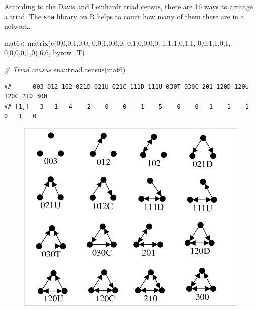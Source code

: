 \documentclass[
  notitlepage,
  onecolumn,
  openany]{book}
\newenvironment{Shaded}{\begin{snugshade}}{\end{snugshade}}
\newcommand{\AttributeTok}[1]{\textcolor[rgb]{0.77,0.63,0.00}{#1}}
\newcommand{\CommentTok}[1]{\textcolor[rgb]{0.56,0.35,0.01}{\textit{#1}}}
\newcommand{\DecValTok}[1]{\textcolor[rgb]{0.00,0.00,0.81}{#1}}
\newcommand{\FunctionTok}[1]{\textcolor[rgb]{0.00,0.00,0.00}{#1}}
\newcommand{\NormalTok}[1]{#1}
\newcommand{\OtherTok}[1]{\textcolor[rgb]{0.56,0.35,0.01}{#1}}
\newcommand{\SpecialCharTok}[1]{\textcolor[rgb]{0.00,0.00,0.00}{#1}}
\begin{document}
According to the Davis and Leinhardt triad census, there are 16 ways to arrange a triad. The \texttt{sna} library on R helps to count how many of them there are in a network.

\begin{Shaded}
\begin{Highlighting}[]
\NormalTok{mat6}\OtherTok{\textless{}{-}}\FunctionTok{matrix}\NormalTok{(}\FunctionTok{c}\NormalTok{(}\DecValTok{0}\NormalTok{,}\DecValTok{0}\NormalTok{,}\DecValTok{0}\NormalTok{,}\DecValTok{1}\NormalTok{,}\DecValTok{0}\NormalTok{,}\DecValTok{0}\NormalTok{,}
               \DecValTok{0}\NormalTok{,}\DecValTok{0}\NormalTok{,}\DecValTok{1}\NormalTok{,}\DecValTok{0}\NormalTok{,}\DecValTok{0}\NormalTok{,}\DecValTok{0}\NormalTok{,}
               \DecValTok{0}\NormalTok{,}\DecValTok{1}\NormalTok{,}\DecValTok{0}\NormalTok{,}\DecValTok{0}\NormalTok{,}\DecValTok{0}\NormalTok{,}\DecValTok{0}\NormalTok{,}
               \DecValTok{1}\NormalTok{,}\DecValTok{1}\NormalTok{,}\DecValTok{1}\NormalTok{,}\DecValTok{0}\NormalTok{,}\DecValTok{1}\NormalTok{,}\DecValTok{1}\NormalTok{,}
               \DecValTok{0}\NormalTok{,}\DecValTok{0}\NormalTok{,}\DecValTok{1}\NormalTok{,}\DecValTok{1}\NormalTok{,}\DecValTok{0}\NormalTok{,}\DecValTok{1}\NormalTok{,}
               \DecValTok{0}\NormalTok{,}\DecValTok{0}\NormalTok{,}\DecValTok{0}\NormalTok{,}\DecValTok{0}\NormalTok{,}\DecValTok{1}\NormalTok{,}\DecValTok{0}\NormalTok{),}\DecValTok{6}\NormalTok{,}\DecValTok{6}\NormalTok{, }\AttributeTok{byrow=}\NormalTok{T)}

\CommentTok{\# Triad census}
\NormalTok{sna}\SpecialCharTok{::}\FunctionTok{triad.census}\NormalTok{(mat6)}
\end{Highlighting}
\end{Shaded}

\begin{verbatim}
##      003 012 102 021D 021U 021C 111D 111U 030T 030C 201 120D 120U 120C 210 300
## [1,]   3   1   4    2    0    0    1    5    0    0   1    1    1    0   1   0
\end{verbatim}

\begin{figure}[h!]

{\centering \includegraphics[width=0.5\linewidth]{images/12-Reciprocity and transitivity/Untitled 3} 

}

\end{figure}
\end{document}
